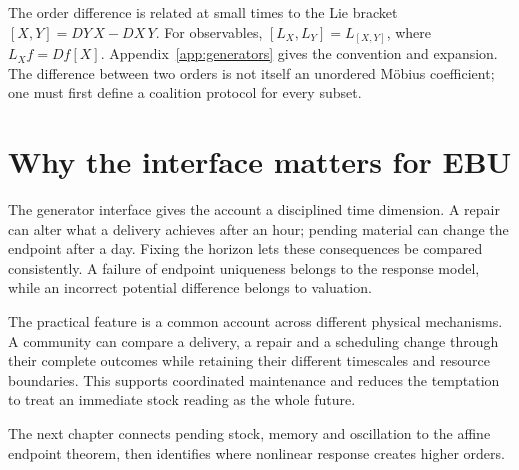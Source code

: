 The order difference is related at small times to the Lie bracket $[X,Y]=DY\,X-DX\,Y$. For observables, $[L_X,L_Y]=L_{[X,Y]}$, where $L_Xf=Df[X]$. Appendix~\ref{app:generators} gives the convention and expansion. The difference between two orders is not itself an unordered Möbius coefficient; one must first define a coalition protocol for every subset.

\section{Why the interface matters for EBU}
The generator interface gives the account a disciplined time dimension. A repair can alter what a delivery achieves after an hour; pending material can change the endpoint after a day. Fixing the horizon lets these consequences be compared consistently. A failure of endpoint uniqueness belongs to the response model, while an incorrect potential difference belongs to valuation.


The practical feature is a common account across different physical mechanisms. A community can compare a delivery, a repair and a scheduling change through their complete outcomes while retaining their different timescales and resource boundaries. This supports coordinated maintenance and reduces the temptation to treat an immediate stock reading as the whole future.

The next chapter connects pending stock, memory and oscillation to the affine endpoint theorem, then identifies where nonlinear response creates higher orders.
